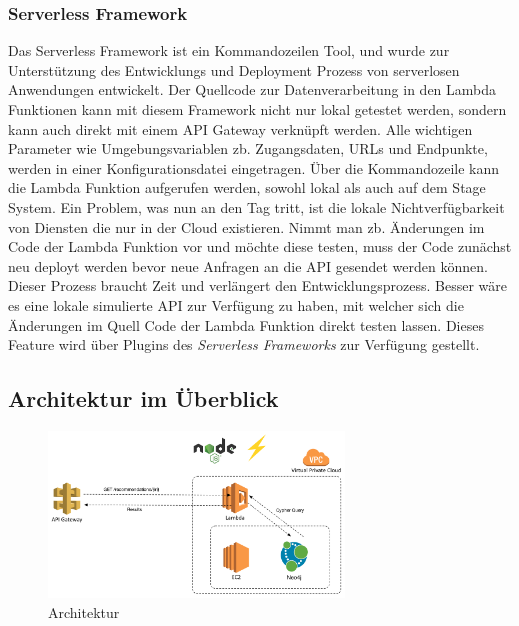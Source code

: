 \subsubsection{Serverless Framework}
Das Serverless Framework ist ein Kommandozeilen Tool, und wurde zur Unterstützung des Entwicklungs und Deployment Prozess von serverlosen Anwendungen entwickelt. 
Der Quellcode zur Datenverarbeitung in den Lambda Funktionen kann mit diesem Framework nicht nur lokal getestet werden, sondern kann auch direkt mit einem API Gateway verknüpft werden. Alle wichtigen Parameter wie Umgebungsvariablen zb. Zugangsdaten, URLs und Endpunkte, werden in einer Konfigurationsdatei eingetragen. Über die Kommandozeile kann die Lambda Funktion aufgerufen werden, sowohl lokal als auch auf dem Stage System. 
Ein Problem, was nun an den Tag tritt, ist die lokale Nichtverfügbarkeit von Diensten die nur in der Cloud existieren. Nimmt man zb. Änderungen im Code der Lambda Funktion vor und möchte diese testen, muss der Code zunächst neu deployt werden bevor neue Anfragen an die API gesendet werden können. Dieser Prozess braucht Zeit und verlängert den Entwicklungsprozess. Besser wäre es eine lokale simulierte API zur Verfügung zu haben, mit welcher sich die Änderungen im Quell Code der Lambda Funktion direkt testen lassen. Dieses Feature wird über Plugins des \textit{Serverless Frameworks} zur Verfügung gestellt.

\subsection{Architektur im Überblick}

\begin{figure}[htb]
 \centering
 \includegraphics[width=0.7\textwidth,angle=0]{abb/Architecture}
 \caption[Beschreibung]{Architektur}
\label{fig:Architektur}
\end{figure}

